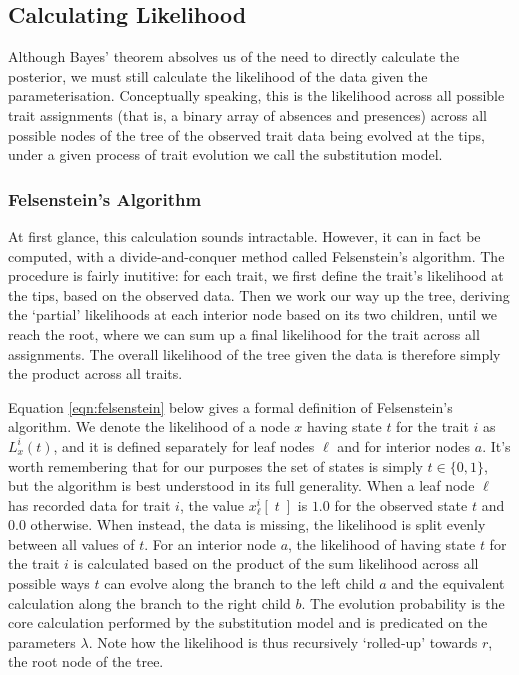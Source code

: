 \documentclass[10pt,journal,compsoc]{IEEEtran}
\begin{document}
\subsection{Calculating Likelihood}

Although Bayes' theorem absolves us of the need to directly calculate the posterior, we must still calculate the likelihood of the data given the parameterisation. Conceptually speaking, this is the likelihood across all possible trait assignments (that is, a binary array of absences and presences) across all possible nodes of the tree of the observed trait data being evolved at the tips, under a given process of trait evolution we call the substitution model.

\subsubsection{Felsenstein's Algorithm}

At first glance, this calculation sounds intractable. However, it can in fact be computed, with a divide-and-conquer method called Felsenstein's algorithm. The procedure is fairly inutitive: for each trait, we first define the trait's likelihood at the tips, based on the observed data. Then we work our way up the tree, deriving the `partial' likelihoods at each interior node based on its two children, until we reach the root, where we can sum up a final likelihood for the trait across all assignments. The overall likelihood of the tree given the data is therefore simply the product across all traits.\cite{felsenstein2004inferring}

Equation \eqref{eqn:felsenstein} below gives a formal definition of Felsenstein's algorithm. We denote the likelihood of a node $x$ having state $t$ for the trait $i$ as $L_x^{i}(t)$, and it is defined separately for leaf nodes $\ell$ and for interior nodes $a$. It's worth remembering that for our purposes the set of states is simply $t \in \{0, 1\}$, but the algorithm is best understood in its full generality. When a leaf node $\ell$ has recorded data for trait $i$, the value $x_\ell^{i}\left[\;t\;\right]$ is $1.0$ for the observed state $t$ and $0.0$ otherwise. When instead, the data is missing, the likelihood is split evenly between all values of $t$. For an interior node $a$, the likelihood of having state $t$ for the trait $i$ is calculated based on the product of the sum likelihood across all possible ways $t$ can evolve along the branch to the left child $a$ and the equivalent calculation along the branch to the right child $b$. The evolution probability is the core calculation performed by the substitution model and is predicated on the parameters $\lambda$. Note how the likelihood is thus recursively `rolled-up' towards $r$, the root node of the tree.
\end{document}

